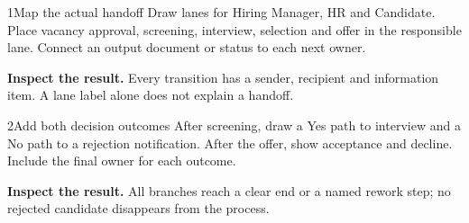 
\begin{labquestion}{1}{Map the actual handoff}
Draw lanes for Hiring Manager, HR and Candidate. Place vacancy approval, screening, interview, selection and offer in the responsible lane. Connect an output document or status to each next owner.
\end{labquestion}
\begin{labanswer}\textbf{Inspect the result.} Every transition has a sender, recipient and information item. A lane label alone does not explain a handoff.\end{labanswer}

\begin{labquestion}{2}{Add both decision outcomes}
After screening, draw a Yes path to interview and a No path to a rejection notification. After the offer, show acceptance and decline. Include the final owner for each outcome.
\end{labquestion}
\begin{labanswer}\textbf{Inspect the result.} All branches reach a clear end or a named rework step; no rejected candidate disappears from the process.\end{labanswer}
